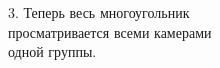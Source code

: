 \documentclass[preview]{standalone}
\begin{document}
\begin{center}
3. Теперь весь многоугольник\\просматривается всеми камерами\\одной группы.
\end{center}
\end{document}
